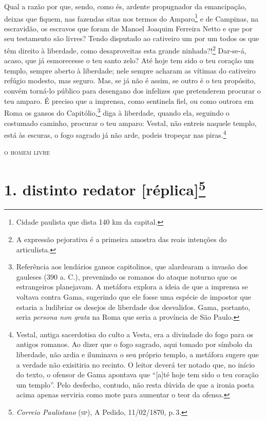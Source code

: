 Qual a razão por que, sendo, como és, ardente propugnador da
emancipação, deixas que fiquem, nas fazendas sitas nos termos do
Amparo\footnote{ Cidade paulista que dista 140 km da capital.} e de
Campinas, na escravidão, os escravos que foram de Manoel Joaquim
Ferreira Netto e que por seu testamento são livres? Tendo disputado ao
cativeiro um por um todos os que têm direito à liberdade, como
desaproveitas esta grande ninhada?!\footnote{ A expressão pejorativa é
  a primeira amostra das reais intenções do articulista.} Dar-se-á,
acaso, que já esmorecesse o teu santo zelo? Até hoje tem sido o teu
coração um templo, sempre aberto à liberdade; nele sempre acharam as
vítimas do cativeiro refúgio modesto, mas seguro. Mas, se já não é
assim, se outro é o teu propósito, convém torná-lo público para
desengano dos infelizes que pretenderem procurar o teu amparo. É preciso
que a imprensa, como sentinela fiel, ou como outrora em Roma os gansos
do Capitólio,\footnote{ Referência aos lendários gansos capitolinos,
  que alardearam a invasão dos gauleses (390 a. C.), prevenindo os
  romanos do ataque noturno que os estrangeiros planejavam. A metáfora
  explora a ideia de que a imprensa se voltava contra Gama, sugerindo
  que ele fosse uma espécie de impostor que estaria a ludibriar os
  desejos de liberdade dos desvalidos. Gama, portanto, seria
  \emph{persona non grata} na Roma que seria a província de São Paulo.}
diga à liberdade, quando ela, seguindo o costumado caminho, procurar o
teu amparo: Vestal, não entreis naquele templo, está às escuras, o fogo
sagrado já não arde, podeis tropeçar nas piras.\footnote{ Vestal,
  antiga sacerdotisa do culto a Vesta, era a divindade do fogo para os
  antigos romanos. Ao dizer que o fogo sagrado, aqui tomado por símbolo
  da liberdade, não ardia e iluminava o seu próprio templo, a metáfora
  sugere que a verdade não exisitiria no recinto. O leitor deverá ter
  notado que, no início do texto, o ofensor de Gama apontava que
  ``{[}a{]}té hoje tem sido o teu coração um templo''. Pelo desfecho,
  contudo, não resta dúvida de que a ironia posta acima apenas serviria
  como mote para aumentar o teor da ofensa.}

\begin{flushright}
\textsc{o homem livre}
\end{flushright}

\chapter{1. distinto redator {[}réplica{]}\footnote{\emph{Correio Paulistano} (\textsc{sp}), A Pedido, 11/02/1870,
  p.\,3.}} %

